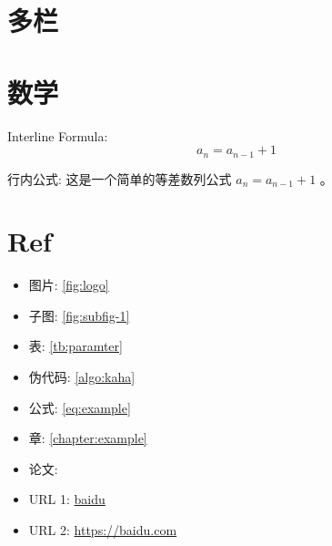 \documentclass[UTF8]{ctexrep}
\begin{document}
\section{多栏}
\begin{multicols}{2}
    \lipsum[1-3]
\end{multicols}

\section{数学}

Interline Formula:
\begin{equation}
    \label{eq:example}
    a_n = a_{n-1} + 1
\end{equation}

行内公式:
这是一个简单的等差数列公式 $a_n = a_{n-1} + 1$ 。

\section{Ref}
\begin{itemize}
    \item 图片: \autoref{fig:logo}
    \item 子图: \autoref{fig:subfig-1}
    \item 表: \autoref{tb:paramter}
    \item 伪代码: \autoref{algo:kaha}
    \item 公式: \autoref{eq:example}
    \item 章: \autoref{chapter:example}
    \item 论文: \cite{he2016deep}
    \item URL 1: \href{https://baidu.com}{baidu}
    \item URL 2: \url{https://baidu.com}
\end{itemize}


\printbibliography[title={参考文献}]
\end{document}
